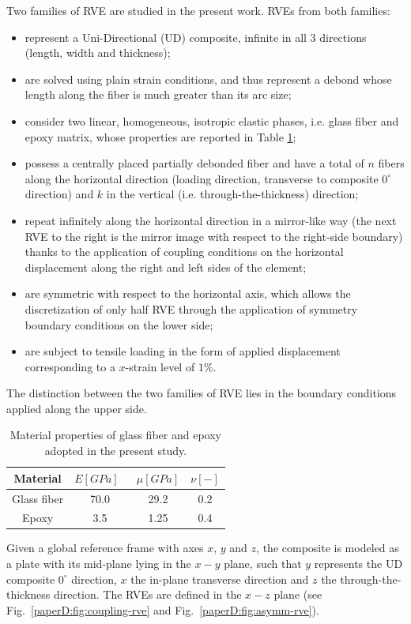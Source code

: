 Two families of RVE are studied in the present work. RVEs from both families:
\begin{itemize}
\item represent a Uni-Directional (UD) composite, infinite in all 3 directions (length, width and thickness);
\item are solved using plain strain conditions, and thus represent a debond whose length along the fiber is much greater than its arc size;
\item consider two linear, homogeneous, isotropic elastic phases, i.e. glass fiber and epoxy matrix, whose properties are reported in Table \ref{paperD:tab:phaseprop};
\item possess a centrally placed partially debonded fiber and have a total of $n$ fibers along the horizontal direction (loading direction, transverse to composite $0^{\circ}$ direction) and $k$ in the vertical (i.e. through-the-thickness) direction;
\item repeat infinitely along the horizontal direction in a mirror-like way (the next RVE to the right is the mirror image with respect to the right-side boundary) thanks to the application of coupling conditions on the horizontal displacement along the right and left sides of the element;
\item are symmetric with respect to the horizontal axis, which allows the discretization of only half RVE through the application of symmetry boundary conditions on the lower side;
\item are subject to tensile loading in the form of applied displacement corresponding to a $x$-strain level of $1\%$.
\end{itemize}
The distinction between the two families of RVE lies in the boundary conditions applied along the upper side.

\begin{table}[!htbp]
 \centering
 \caption{Material properties of glass fiber and epoxy adopted in the present study.}
 \begin{tabular}{cccc}
\textbf{Material} & \textbf{$E\left[GPa\right]$}\ & \textbf{$\mu\left[GPa\right]$} & \textbf{$\nu\left[-\right]$} \\
\midrule
Glass fiber    & 70.0  & 29.2   & 0.2  \\
Epoxy    & 3.5    & 1.25   & 0.4
\end{tabular}
\label{paperD:tab:phaseprop}
\end{table}

Given a global reference frame with axes $x$, $y$ and $z$, the composite is modeled as a plate with its mid-plane lying in the $x-y$ plane, such that $y$ represents the UD composite $0^{\circ}$ direction, $x$ the in-plane transverse direction and $z$ the through-the-thickness direction. The RVEs are defined in the $x-z$ plane (see Fig.~\ref{paperD:fig:coupling-rve} and Fig.~\ref{paperD:fig:asymm-rve}).

